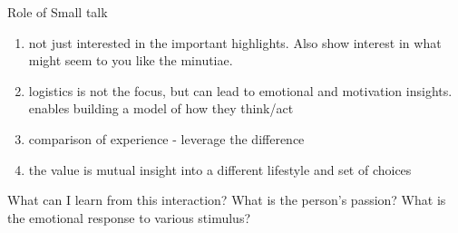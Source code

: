 Role of Small talk
\begin{enumerate}
\item not just interested in the important highlights. Also show interest in what might seem to you like the minutiae. 
\item logistics is not the focus, but can lead to emotional and motivation insights. enables building a model of how they think/act
\item comparison of experience - leverage the difference
\item the value is mutual insight into a different lifestyle and set of choices
\end{enumerate}

What can I learn from this interaction?
What is the person's passion?
What is the emotional response to various stimulus?


